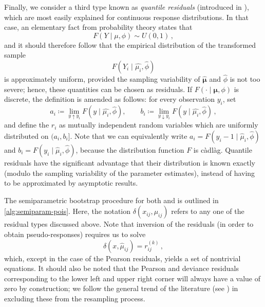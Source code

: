 \documentclass[a4paper]{book}
\begin{document}
Finally, we consider a third type known as \emph{quantile residuals} (introduced in \cite{dunn:rand-quant-res}), which are most easily explained for continuous response distributions. In that case, an elementary fact from probability theory states that
\begin{equation}
  F(Y \mid \mu, \phi) \sim U(0, 1) \,,
\end{equation}
and it should therefore follow that the empirical distribution of the transformed sample
\begin{equation}
  F(Y_i \mid \widehat{\mu_i}, \widehat{\phi})
\end{equation}
is approximately uniform, provided the sampling variability of $\bm{\widehat{\mu}}$ and $\widehat{\phi}$ is not too severe; hence, these quantities can be chosen as residuals. If $F(\cdot \mid \bm{\mu}, \phi)$ is discrete, the definition is amended as follows: for every observation $y_i$, set
\begin{equation}
  a_i \coloneqq \lim_{y \uparrow y_i} F(y \mid \widehat{\mu_i}, \widehat{\phi}), \qquad b_i \coloneqq \lim_{y \downarrow y_i} F(y \mid \widehat{\mu_i}, \widehat{\phi}) \,,
\end{equation}
and define the $r_i$ as mutually independent random variables which are uniformly distributed on $(a_i, b_i]$. Note that we can equivalently write $a_i = F(y_i - 1 \mid \widehat{\mu}_i, \widehat{\phi})$ and $b_i = F(y_i \mid \widehat{\mu}_i, \widehat{\phi})$, because the distribution function $F$ is c\`adl\`ag. Quantile residuals have the significant advantage that their distribution is known exactly (modulo the sampling variability of the parameter estimates), instead of having to be approximated by asymptotic results.

The semiparametric bootstrap procedure for both  and  is outlined in \cref{alg:semiparam-pois}. Here, the notation $\delta(x_{ij}, \mu_{ij})$ refers to any one of the residual types discussed above. Note that inversion of the residuals (in order to obtain pseudo-responses) requires us to solve
\begin{equation}
  \delta(x, \widehat{\mu}_{ij}) = r^{(k)}_{ij} \,,
\end{equation}
which, except in the case of the Pearson residuals, yields a set of nontrivial equations. It should also be noted that the Pearson and deviance residuals corresponding to the lower left and upper right corner will always have a value of zero by construction; we follow the general trend of the literature (see \cites[706]{pinheiro}[6]{verdonck}) in excluding these from the resampling process.
\end{document}
